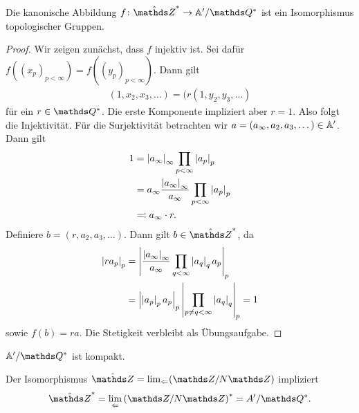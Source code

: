 \begin{prop}
Die kanonische Abbildung $f \colon \hat{\Z}^\ast \to \A'/\Q^\ast$
ist ein Isomorphismus topologischer Gruppen.
\end{prop}
\begin{proof}
Wir zeigen zunächst, dass $f$ injektiv ist.
Sei dafür $f((x_p)_{p<\infty})=f((y_p)_{p<\infty})$. Dann gilt
\begin{align*}
(1,x_2,x_3,\dots)=(r (1,y_2,y_3,\dots)
\end{align*}
für ein $r\in \Q^\ast$.
Die erste Komponente impliziert aber $r=1$. Also folgt die Injektivität.
Für die Surjektivität betrachten wir $a=(a_\infty,a_2,a_3,\dots)\in \mathbb{A}'$. Dann gilt
\begin{align*}
1&=\left\vert a_\infty\right\vert_\infty \prod_{p<\infty}\left\vert a_p\right\vert_p\\
&=a_\infty \frac{\left\vert a_\infty\right\vert_\infty}{a_\infty}\prod_{p<\infty} \left\vert a_p\right\vert_p\\
&\eqqcolon a_\infty \cdot r.
\end{align*}
Definiere $b=(r,a_2,a_3,\dots)$. Dann gilt $b \in \hat{\Z}^\ast$, da
\begin{align*}
\left\vert r a_p\right\vert_p&=\left\vert\frac{\left\vert a_\infty\right\vert_\infty}{a_\infty}\prod_{q<\infty} \left\vert a_q\right\vert_q a_p\right\vert_p\\
&=\left\vert\left\vert a_p\right\vert_p a_p\right\vert_p \left\vert\prod_{p\not =q <\infty} \left\vert a_q\right\vert_q\right\vert_p=1
\end{align*}
sowie
$f(b)=ra$.
Die Stetigkeit verbleibt als Übungsaufgabe.
\end{proof}

\begin{cor}
$\A'/\Q^\ast$ ist kompakt.
\end{cor}

Der Isomorphismus $\hat{\Z}=\lim_{\Leftarrow} (\Z/N\Z)$ impliziert
\begin{align*}
\hat{\Z}^\ast=\lim_{\Leftarrow} \left(\Z/N\Z\right)^\ast=A'/\Q^\ast.
\end{align*}